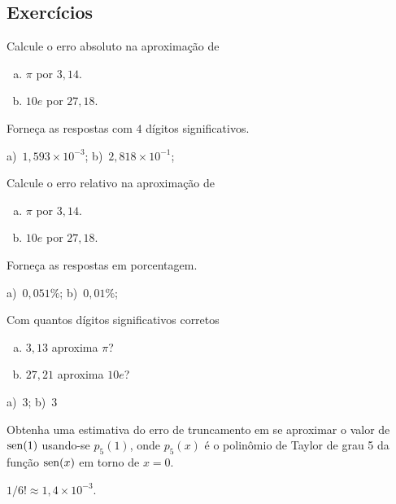 \subsection{Exercícios}

\begin{exer}\label{exer:erro_abs}
  Calcule o erro absoluto na aproximação de
  \begin{enumerate}[a)]
  \item $\pi$ por $3,14$.
  \item $10e$ por $27,18$.
  \end{enumerate}
  Forneça as respostas com $4$ dígitos significativos.
\end{exer}
\begin{resp}
  a)~$1,593\times 10^{-3}$; b)~$2,818\times 10^{-1}$;
\end{resp}

\begin{exer}\label{exer:erro_rel}
  Calcule o erro relativo na aproximação de
  \begin{enumerate}[a)]
  \item $\pi$ por $3,14$.
  \item $10e$ por $27,18$.
  \end{enumerate}
  Forneça as respostas em porcentagem.
\end{exer}
\begin{resp}
  a)~$0,051\%$; b)~$0,01\%$;
\end{resp}

\begin{exer}\label{exer:dig_corr}
  Com quantos dígitos significativos corretos
  \begin{enumerate}[a)]
  \item $3,13$ aproxima $\pi$?
  \item $27,21$ aproxima $10e$?
  \end{enumerate}
\end{exer}
\begin{resp}
  a)~$3$; b)~$3$
\end{resp}


\begin{exer}
  Obtenha uma estimativa do erro de truncamento em se aproximar o valor de $\operatorname{sen}(1)$ usando-se $p_5(1)$, onde $p_5(x)$ é o polinômio de Taylor de grau 5 da função $\operatorname{sen}(x)$ em torno de $x=0$.
\end{exer}
\begin{resp}
  $1/6! \approx 1,4\times 10^{-3}$.
\end{resp}

